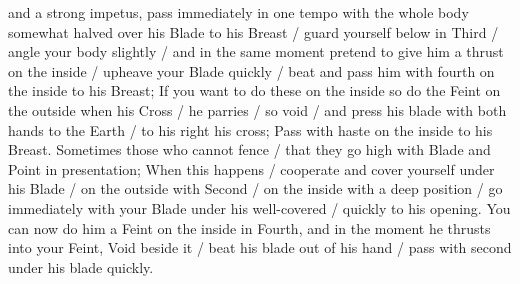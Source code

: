 \newpage


\newpage


and a strong impetus, pass immediately in one tempo with the whole
body somewhat halved over his Blade to his Breast / guard yourself
below in Third / angle your body slightly / and in the same moment
pretend to give him a thrust on the inside / upheave
your Blade quickly / beat and pass him with fourth on the inside to
his Breast; If you want to do these on the inside so do the Feint on
the outside when his Cross / he parries / so void / and press his
blade with both hands to the Earth / to his right his cross; Pass with
haste on the inside to his Breast. Sometimes those who cannot fence /
that they go high with Blade and Point in presentation; When this
happens / cooperate and cover yourself under his Blade / on the
outside with Second / on the inside with a deep position / go
immediately with your Blade under his well-covered / quickly to his
opening. You can now do him a Feint on the inside in Fourth, and in the
moment he thrusts into your Feint, Void beside it / beat his blade
out of his hand / pass with second under his blade quickly.


